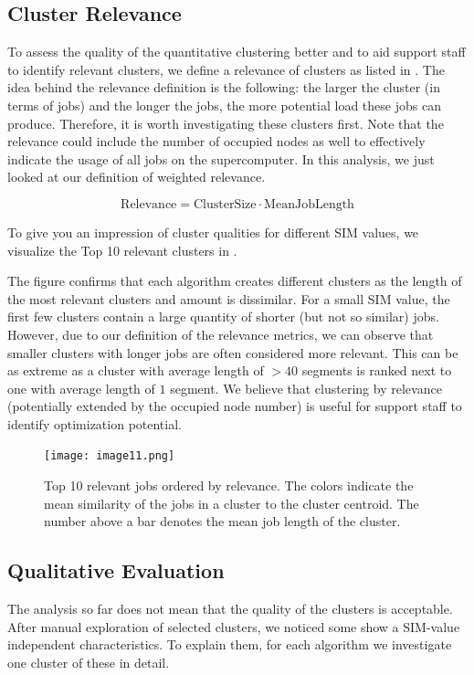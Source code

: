 \documentclass{jhps}
\begin{document}
\subsection{Cluster Relevance}

To assess the quality of the quantitative clustering better and to aid support staff to identify relevant clusters, we define a relevance of clusters as listed in .
The idea behind the relevance definition is the following: the larger the cluster (in terms of jobs) and the longer the jobs, the more potential load these jobs can produce.
Therefore, it is worth investigating these clusters first.
Note that the relevance could include the number of occupied nodes as well to effectively indicate the usage of all jobs on the supercomputer.
In this analysis, we just looked at our definition of weighted relevance.

\begin{equation}
\text{Relevance} = \text{ClusterSize} \cdot \text{MeanJobLength}
\label{eq:rel}
\end{equation}

To give you an impression of cluster qualities for different SIM values, we visualize the Top 10 relevant clusters in .

The figure confirms that each algorithm creates different clusters as the length of the most relevant clusters and amount is dissimilar.
For a small SIM value, the first few clusters contain a large quantity of shorter (but not so similar) jobs.
However, due to our definition of the relevance metrics, we can observe that smaller clusters with longer jobs are often considered more relevant.
This can be as extreme as a cluster with average length of $>40$ segments is ranked next to one with average length of $1$ segment.
We believe that clustering by relevance (potentially extended by the occupied node number) is useful for support staff to identify optimization potential.

\begin{figure}
  \centering
   \texttt{[image: image11.png]}
   \caption{Top 10 relevant jobs ordered by relevance.
   The colors indicate the mean similarity of the jobs in a cluster to the cluster centroid.
   The number above a bar denotes the mean job length of the cluster.}
   \label{fig:top10_relevant_jobs}
\end{figure}

\subsection{Qualitative Evaluation}
The analysis so far does not mean that the quality of the clusters is acceptable.
After manual exploration of selected clusters, we noticed some show a SIM-value independent characteristics.
To explain them, for each algorithm we investigate one cluster of these in detail.
\end{document}

